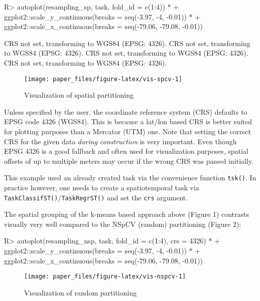 \documentclass[
]{jss}
\begin{document}
\begin{CodeChunk}
\begin{CodeInput}
R> autoplot(resampling_sp, task, fold_id = c(1:4)) *
+   ggplot2::scale_y_continuous(breaks = seq(-3.97, -4, -0.01)) *
+   ggplot2::scale_x_continuous(breaks = seq(-79.06, -79.08, -0.01))
\end{CodeInput}
\begin{CodeOutput}
CRS not set, transforming to WGS84 (EPSG: 4326).
CRS not set, transforming to WGS84 (EPSG: 4326).
CRS not set, transforming to WGS84 (EPSG: 4326).
CRS not set, transforming to WGS84 (EPSG: 4326).
\end{CodeOutput}
\begin{figure}[!b]

{\centering \texttt{[image: paper\_files/figure-latex/vis-spcv-1]} 

}

\caption[Visualization of spatial partitioning]{Visualization of spatial partitioning}\label{fig:vis-spcv}
\end{figure}
\end{CodeChunk}

\hfill\break

Unless specified by the user, the coordinate reference system (CRS)
defaults to EPSG code 4326 (WGS84). This is because a lat/lon based CRS
is better suited for plotting purposes than a Mercator (UTM) one. Note
that setting the correct CRS for the given data \emph{during
construction} is very important. Even though EPSG 4326 is a good
fallback and often used for visualization purposes, spatial offsets of
up to multiple meters may occur if the wrong CRS was passed initially.

This example used an already created task via the convenience function
\texttt{tsk()}. In practice however, one needs to create a
spatiotemporal task via \texttt{TaskClassifST()}/\texttt{TaskRegrST()}
and set the \texttt{crs} argument.

The spatial grouping of the k-means based approach above (Figure 1)
contrasts visually very well compared to the NSpCV (random) partitioning
(Figure 2):

\begin{CodeChunk}
\begin{CodeInput}
R> autoplot(resampling_nsp, task, fold_id = c(1:4), crs = 4326) *
+   ggplot2::scale_y_continuous(breaks = seq(-3.97, -4, -0.01)) *
+   ggplot2::scale_x_continuous(breaks = seq(-79.06, -79.08, -0.01))
\end{CodeInput}
\begin{figure}[!b]

{\centering \texttt{[image: paper\_files/figure-latex/vis-nspcv-1]} 

}

\caption[Visualization of random partitioning]{Visualization of random partitioning}\label{fig:vis-nspcv}
\end{figure}
\end{CodeChunk}
\end{document}
